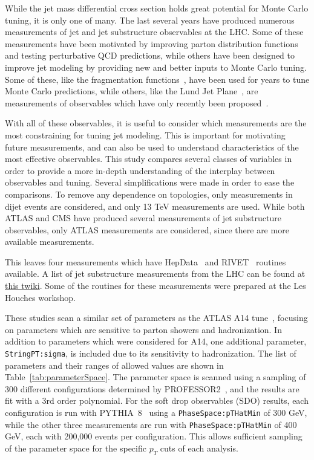 While the jet mass differential cross section holds great potential for Monte Carlo tuning, it is only one of many. The last several years have produced numerous measurements of jet and jet substructure observables at the LHC. 
Some of these measurements have been motivated by improving parton distribution functions and testing perturbative QCD predictions, 
while others have been designed to improve jet modeling by providing new and better inputs to Monte Carlo tuning.
Some of these, like the fragmentation functions~\cite{Aad:2019onw}, have been used for years to tune Monte Carlo predictions, 
while others, like the Lund Jet Plane~\cite{lundAtlas}, are measurements of observables which have only recently been proposed~\cite{lundPlane}.

With all of these observables, it is useful to consider which measurements are the most constraining for tuning jet modeling.
This is important for motivating future measurements, and can also be used to understand characteristics of the most effective observables.
This study compares several classes of variables in order to provide a more in-depth understanding of the interplay between observables and tuning.
Several simplifications were made in order to ease the comparisons. 
To remove any dependence on topologies, only measurements in dijet events are considered, and only 13 TeV measurements are used.
While both ATLAS and CMS have produced several measurements of jet substructure observables, only ATLAS measurements are considered, since there are more available measurements.

This leaves four measurements which have HepData~\cite{Buckley:2010jn,Maguire:2017ypu} and RIVET~\cite{Buckley:2010ar} routines available.  A list of jet substructure measurements from the LHC can be found at \href{https://twiki.cern.ch/twiki/bin/view/LHCPhysics/LHCJetSubstructureMeasurements}{this twiki}.  Some of the routines for these measurements were prepared at the Les Houches workshop.


These studies scan a similar set of parameters as the ATLAS A14 tune~\cite{ATL-PHYS-PUB-2014-021}, focusing on parameters which are sensitive to parton showers and hadronization.
In addition to parameters which were considered for A14, one additional parameter, \texttt{StringPT:sigma}, is included due to its sensitivity to hadronization.
The list of parameters and their ranges of allowed values are shown in Table~\ref{tab:parameterSpace}.
The parameter space is scanned using a sampling of 300 different configurations determined by PROFESSOR2~\cite{Buckley:2009bj}, and the results are fit with a 3rd order polynomial.
For the soft drop observables (SDO) results, each configuration is run with PYTHIA~8~\cite{Sjostrand:2006za,Sjostrand:2007gs,Sjostrand:2014zea} using a \texttt{PhaseSpace:pTHatMin} of 300 GeV, 
while the other three measurements are run with \texttt{PhaseSpace:pTHatMin} of 400 GeV, each with 200,000 events per configuration. 
This allows sufficient sampling of the parameter space for the specific $p_{T}$ cuts of each analysis. 


